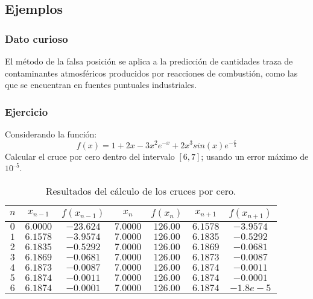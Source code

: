 \subsection{Ejemplos}

\subsubsection{Dato curioso}
El método de la falsa posición se aplica a la predicción de cantidades traza de contaminantes atmosféricos producidos por reacciones de combustión, como las que se encuentran en fuentes puntuales industriales.

\subsubsection{Ejercicio}
Considerando la función:
\begin{displaymath}
    f(x) = 1 + 2x - 3x^2e^{-x} + 2x^3sin(x)e^{- \frac{x}{5}}
\end{displaymath}
Calcular el cruce por cero dentro del intervalo $ [6, 7] $; usando un error máximo de $ 10^{–5} $.

\begin{table}[h!]
    \centering
    \caption{Resultados del cálculo de los cruces por cero.}
    \label{table1_regula_falsi}
    \begin{tabular}{c|c|c|c|c|c|c}
        \textbf{$ n $} & \textbf{$ x_{n-1} $} & \textbf{$ f(x_{n-1}) $} & \textbf{$ x_n $} & \textbf{$ f(x_n) $} & \textbf{$ x_{n+1} $} & \textbf{$ f(x_{n+1}) $}\\
        \hline
         $ 0 $ & $ 6.0000 $ & $ -23.624 $ & $ 7.0000 $ & $ 126.00 $ & $ 6.1578 $ & $ -3.9574 $ \\
         $ 1 $ & $ 6.1578 $ & $ -3.9574 $ & $ 7.0000 $ & $ 126.00 $ & $ 6.1835 $ & $ -0.5292 $ \\ 
         $ 2 $ & $ 6.1835 $ & $ -0.5292 $ & $ 7.0000 $ & $ 126.00 $ & $ 6.1869 $ & $ -0.0681 $ \\ 
         $ 3 $ & $ 6.1869 $ & $ -0.0681 $ & $ 7.0000 $ & $ 126.00 $ & $ 6.1873 $ & $ -0.0087 $ \\ 
         $ 4 $ & $ 6.1873 $ & $ -0.0087 $ & $ 7.0000 $ & $ 126.00 $ & $ 6.1874 $ & $ -0.0011 $ \\ 
         $ 5 $ & $ 6.1874 $ & $ -0.0011 $ & $ 7.0000 $ & $ 126.00 $ & $ 6.1874 $ & $ -0.0001 $ \\ 
         $ 6 $ & $ 6.1874 $ & $ -0.0001 $ & $ 7.0000 $ & $ 126.00 $ & $ 6.1874 $ & $ -1.8e-5 $ \\ 
    \end{tabular}
\end{table}

